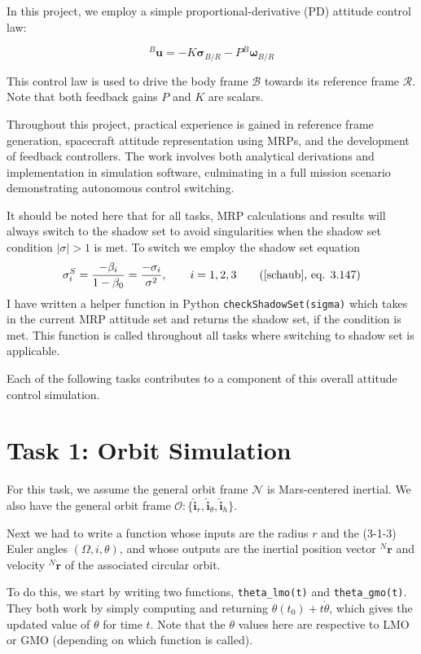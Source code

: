 \documentclass[conf]{new-aiaa}
\begin{document}
In this project, we employ a simple proportional-derivative (PD) attitude control law:

\[
{}^B\bm{u} = -K\bm{\sigma}_{B/R} - P{}^B\bm{\omega}_{B/R}
\]

This control law is used to drive the body frame \(\mathcal{B}\) towards its reference frame \(\mathcal{R}\). Note that both feedback gains \( P \) and \( K \) are scalars.

Throughout this project, practical experience is gained in reference frame generation, spacecraft attitude representation using MRPs, and the development of feedback controllers. The work involves both analytical derivations and implementation in simulation software, culminating in a full mission scenario demonstrating autonomous control switching.

It should be noted here that for all tasks, MRP calculations and results will always switch to the shadow set to avoid singularities when the shadow set condition $|\sigma| > 1$ is met. To switch we employ the shadow set equation
\[
\sigma^S_i = \frac{-\beta_i}{1-\beta_0} = \frac{-\sigma_i}{\sigma^2}, \qquad i=1,2,3 \tag{\cite{schaub},~eq. 3.147}
\]
I have written a helper function in Python \texttt{checkShadowSet(sigma)} which takes in the current MRP attitude set and returns the shadow set, if the condition is met. This function is called throughout all tasks where switching to shadow set is applicable. 

Each of the following tasks contributes to a component of this overall attitude control simulation.






\section{Task 1: Orbit Simulation}
For this task, we assume the general orbit frame \(\mathcal{N}\) is Mars-centered inertial. We also have the general orbit frame $\mathcal{O} : \{{\hat{\bm{i}}_r, \hat{\bm{i}}_{\theta}, \hat{\bm{i}}_h}\}$.

Next we had to write a function whose inputs are the radius \( r \) and the (3-1-3) Euler angles \( (\Omega, i, \theta) \), and whose outputs are the inertial position vector \( {}^N\mathbf{r} \) and velocity \( {}^N\dot{\mathbf{r}} \) of the associated circular orbit.

To do this, we start by writing two functions, \texttt{theta\_lmo(t)} and \texttt{theta\_gmo(t)}. They both work by simply computing and returning $\theta(t_0) + t \dot{\theta}$, which gives the updated value of $\theta$ for time $t$. Note that the $\theta$ values here are respective to LMO or GMO (depending on which function is called). 
\end{document}
